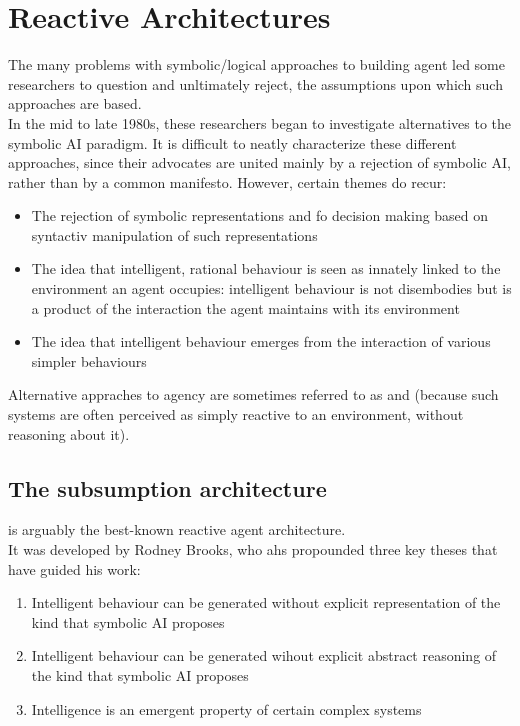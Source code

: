 \section{Reactive Architectures}
The many problems with symbolic/logical approaches to building agent led some researchers to question and unltimately reject, the assumptions upon which such approaches are based.\\
In the mid to late 1980s, these researchers began to investigate alternatives to the symbolic AI paradigm. It is difficult to neatly characterize these different approaches, since their advocates are united mainly by a rejection of symbolic AI, rather than by a common manifesto. However, certain themes do recur:
\begin{itemize}
\item The rejection of symbolic representations and fo decision making based on syntactiv manipulation of such representations
\item The idea that intelligent, rational behaviour is seen as innately linked to the environment an agent occupies: intelligent behaviour is not disembodies but is a product of the interaction the agent maintains with its environment
\item The idea that intelligent behaviour emerges from the interaction of various simpler behaviours
\end{itemize}
Alternative appraches to agency are sometimes referred to as  and  (because such systems are often perceived as simply reactive to an environment, without reasoning about it).

\subsection{The subsumption architecture	}
\phantom{c} is arguably the best-known reactive agent architecture.\\
It was developed by Rodney Brooks, who ahs propounded three key theses that have guided his work:
\begin{enumerate}
\item Intelligent behaviour can be generated without explicit representation of the kind that symbolic AI proposes
\item Intelligent behaviour can be generated wihout explicit abstract reasoning of the kind that symbolic AI proposes
\item Intelligence is an emergent property of certain complex systems
\end{enumerate}

